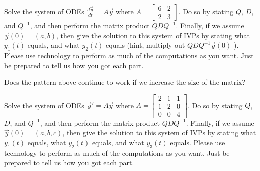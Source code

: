 \begin{problem}
 Solve the system of ODEs $\frac{d\vec y}{dt} = A\vec y$ where 
$A
=\begin{bmatrix}
  6&2\\2&3
 \end{bmatrix}
$. Do so by stating $Q$, $D$, and $Q^{-1}$, and then perform the matrix product $QDQ^{-1}$. Finally, if we assume $\vec y(0) = (a,b)$, then give the solution to this system of IVPs by stating what $y_1(t)$ equals, and what $y_2(t)$ equals (hint, multiply out $QDQ^{-1}\vec y(0)$  ).  Please use technology to perform as much of the computations as you want. Just be prepared to tell us how you got each part.
\end{problem}

Does the pattern above continue to work if we increase the size of the matrix?
\begin{problem}
 Solve the system of ODEs $\vec y '=A\vec y$ where 
$A
=\begin{bmatrix}
  2&1&1\\1&2&0\\0&0&4
 \end{bmatrix}
$. Do so by stating $Q$, $D$, and $Q^{-1}$, and then perform the matrix product $QDQ^{-1}$. Finally, if we assume $\vec y(0) = (a,b,c)$, then give the solution to this system of IVPs by stating what $y_1(t)$ equals, what $y_2(t)$ equals, and what $y_3(t)$ equals. Please use technology to perform as much of the computations as you want. Just be prepared to tell us how you got each part.
\end{problem}

